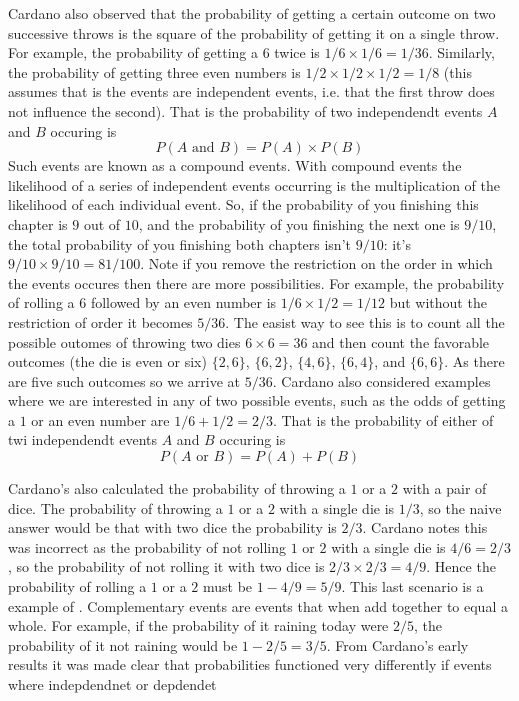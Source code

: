 \myindent Cardano also observed that the probability of getting a certain outcome on two successive throws is the square of the probability of getting it on a single throw. For example, the probability of getting a $6$ twice is $1/6 \times 1/6 = 1/36$. Similarly, the probability of getting three even numbers is $1/2 \times 1/2 \times 1/2 = 1/8$ (this assumes that is the events are independent events, i.e. that the first throw does not influence the second). That is the probability of two independendt events $A$ and $B$ occuring is
\[
P(A \text{ and } B) = P(A) \times P(B)
\]
Such events are known as a compound events. With compound events the likelihood of a series of independent events occurring is the multiplication of the likelihood of each individual event. So, if the probability of you finishing this chapter is $9$ out of $10$, and the probability of you finishing the next one is $9/10$, the total probability of you finishing both chapters isn't $9/10$: it's $9/10 \times 9/10 = 81/100$. Note if you remove the restriction on the order in which the events occures then there are more possibilities. For example, the probability of rolling a $6$ followed by an even number is $1/6 \times 1/2 = 1/12$ but without the restriction of order it becomes $5/36$. The easist way to see this is to count all the possible outomes of throwing two dies $6 \times 6 = 36$ and then count the favorable  outcomes (the die is even or six) $\{2,6\}$, $\{6,2\}$, $\{4,6\}$, $\{6,4\}$, and $\{6,6\}$. As there are five such outcomes so we arrive at $5/36$. Cardano also considered examples where we are interested in any of two possible events, such as the odds of getting a $1$ or an even number are $1/6 + 1/2 = 2/3$. That is the probability of either of twi independendt events $A$ and $B$ occuring is
\[
P(A \text{ or } B) = P(A) + P(B)
\]

\myindent Cardano’s also calculated the probability of throwing a $1$ or a $2$ with a pair of dice. The probability of throwing a $1$ or a $2$ with a single die is $1/3$, so the naive answer would be that with two dice the probability is $2/3$. Cardano notes this was incorrect as the probability of not rolling $1$ or $2$ with a single die is $4/6 = 2/3$, so the probability of not rolling it with two dice is $2/3 \times 2/3 = 4/9$. Hence the probability of rolling a $1$ or a $2$ must be $1 - 4/9 = 5/9$. This last scenario is a example of . Complementary events are events that when add together to equal a whole. For example, if the probability of it raining today were $2/5$, the probability of it not raining would be $1 - 2/5 = 3/5$. From Cardano's early results it was made clear that probabilities functioned very differently if events where indepdendnet or depdendet

